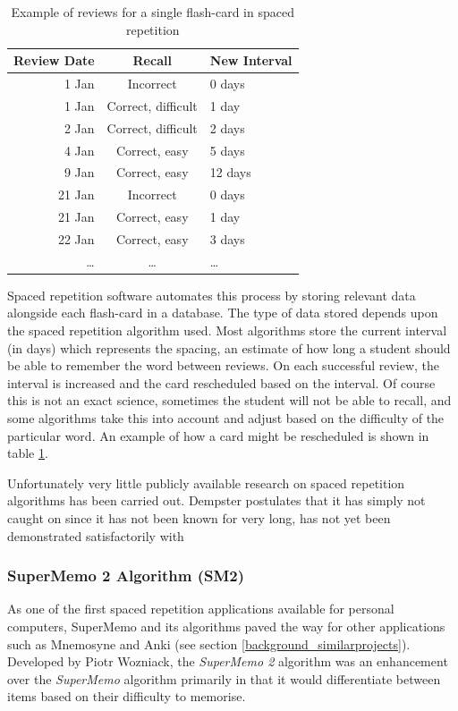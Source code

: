 \begin{table}[h!]
\caption{Example of reviews for a single flash-card in spaced repetition}
\label{tbl_spacedrepetitionexample}
\begin{tabular}{|r|c|l|}
\hline
Review Date & Recall & New Interval \\
\hline
1 Jan & Incorrect & 0 days \\
1 Jan & Correct, difficult & 1 day \\
2 Jan & Correct, difficult & 2 days \\
4 Jan & Correct, easy & 5 days \\
9 Jan & Correct, easy & 12 days \\
21 Jan & Incorrect & 0 days \\
21 Jan & Correct, easy & 1 day \\
22 Jan & Correct, easy & 3 days \\
\ldots & \ldots & \ldots \\
\hline
\end{tabular}
\end{table}

Spaced repetition software automates this process by storing relevant data alongside each
flash-card in a database. The type of data stored depends upon the spaced repetition algorithm
used. Most algorithms store the current interval (in days) which represents the spacing,
an estimate of how long a student should be able to remember the word between reviews.
On each successful review, the interval is increased and the card rescheduled based on
the interval. Of course this is not an exact science, sometimes the student will not be able to recall,
and some algorithms take this into account and adjust based on the difficulty of the
particular word. An example of how a card might be rescheduled
is shown in table \ref{tbl_spacedrepetitionexample}.

Unfortunately very little publicly available research on spaced repetition
algorithms has been carried out. Dempster
postulates\cite{dempster_spacing_effect_1988} that it has simply not caught
on since it has not been known for very long, has not yet been demonstrated
satisfactorily with %

\subsubsection*{SuperMemo 2 Algorithm (SM2)}
As one of the first spaced repetition applications available for personal computers, %
SuperMemo and its algorithms paved the way for other applications such as Mnemosyne and
Anki (see section \ref{background_similarprojects}). Developed by Piotr
Wozniack\cite{wozniak_optimization_1990}, the \textit{SuperMemo 2} algorithm was an
enhancement over the \textit{SuperMemo} algorithm primarily in that it would differentiate 
between items based on their difficulty to memorise\cite{wozniak_optimization_1990}.


